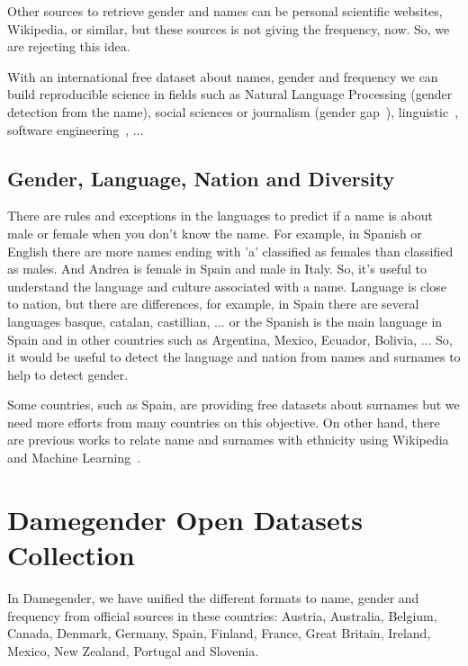 \documentclass[a4paper]{article}
\begin{document}
Other sources to retrieve gender and names can be personal
scientific websites, Wikipedia, or similar, but these sources is not
giving the frequency, now. So, we are rejecting this idea. 

With an international free dataset about names, gender and frequency
we can build reproducible science in fields such as Natural Language
Processing (gender detection from the name), social sciences or
journalism (gender
gap~\cite{holman2018gender,mislove2011understanding,niemi2017gendered,de2014genero}),
linguistic~\cite{lawson2005russian,krueger1962mongolian,van2020gender,agyekum2006sociolinguistic,fraser1987lexicon},
software engineering~\cite{vasilescu2012gender}, ...

\subsection{Gender, Language, Nation and Diversity}
\label{sec:diversity}

There are rules and exceptions in the languages to predict if a name
is about male or female when you don't know the name. For example, in
Spanish or English there are more names ending with 'a' classified as
females than classified as males. And Andrea is female in Spain and
male in Italy. So, it's useful to understand the language and culture
associated with a name. Language is close to nation, but there are
differences, for example, in Spain there are several languages basque,
catalan, castillian, ... or the Spanish is the main language in Spain
and in other countries such as Argentina, Mexico, Ecuador, Bolivia,
... So, it would be useful to detect the language and nation from
names and surnames to help to detect gender.

Some countries, such as Spain, are providing free datasets about
surnames but we need more efforts from many countries on this
objective. On other hand, there are previous works to relate name and
surnames with ethnicity using Wikipedia and Machine
Learning~\cite{ambekar2009name}.

\section{Damegender Open Datasets Collection}
\label{sec:damegender}

In Damegender, we have unified the different formats to name, gender
and frequency from official sources in these countries: Austria,
Australia, Belgium, Canada, Denmark, Germany, Spain, Finland, France,
Great Britain, Ireland, Mexico, New Zealand, Portugal and Slovenia.
\end{document}
